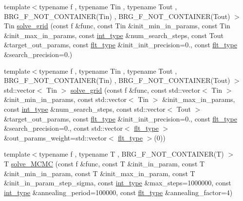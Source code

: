 \begin{DoxyCompactItemize}
\item 
{\footnotesize template$<$typename f , typename Tin , typename Tout , B\+R\+G\+\_\+\+F\+\_\+\+N\+O\+T\+\_\+\+C\+O\+N\+T\+A\+I\+N\+E\+R(\+Tin) , B\+R\+G\+\_\+\+F\+\_\+\+N\+O\+T\+\_\+\+C\+O\+N\+T\+A\+I\+N\+E\+R(\+Tout) $>$ }\\Tin \hyperlink{namespaceIceBRG_aa1178c976ba772b025aacf4b686cf17f}{solve\+\_\+grid} (const f \&func, const Tin \&init\+\_\+min\+\_\+in\+\_\+params, const Tin \&init\+\_\+max\+\_\+in\+\_\+params, const \hyperlink{lib_2IceBRG__main_2common_8h_ac4de9d9335536ac22821171deec8d39e}{int\+\_\+type} \&num\+\_\+search\+\_\+steps, const Tout \&target\+\_\+out\+\_\+params, const \hyperlink{lib_2IceBRG__main_2common_8h_ad0f130a56eeb944d9ef2692ee881ecc4}{flt\+\_\+type} \&init\+\_\+init\+\_\+precision=0., const \hyperlink{lib_2IceBRG__main_2common_8h_ad0f130a56eeb944d9ef2692ee881ecc4}{flt\+\_\+type} \&search\+\_\+precision=0.)
\item 
{\footnotesize template$<$typename f , typename Tin , typename Tout , B\+R\+G\+\_\+\+F\+\_\+\+N\+O\+T\+\_\+\+C\+O\+N\+T\+A\+I\+N\+E\+R(\+Tin) , B\+R\+G\+\_\+\+F\+\_\+\+N\+O\+T\+\_\+\+C\+O\+N\+T\+A\+I\+N\+E\+R(\+Tout) $>$ }\\std\+::vector$<$ Tin $>$ \hyperlink{namespaceIceBRG_a796f8239c7c8e5771b901fe380d24b96}{solve\+\_\+grid} (const f \&func, const std\+::vector$<$ Tin $>$ \&init\+\_\+min\+\_\+in\+\_\+params, const std\+::vector$<$ Tin $>$ \&init\+\_\+max\+\_\+in\+\_\+params, const \hyperlink{lib_2IceBRG__main_2common_8h_ac4de9d9335536ac22821171deec8d39e}{int\+\_\+type} \&num\+\_\+search\+\_\+steps, const std\+::vector$<$ Tout $>$ \&target\+\_\+out\+\_\+params, const \hyperlink{lib_2IceBRG__main_2common_8h_ad0f130a56eeb944d9ef2692ee881ecc4}{flt\+\_\+type} \&init\+\_\+init\+\_\+precision=0., const \hyperlink{lib_2IceBRG__main_2common_8h_ad0f130a56eeb944d9ef2692ee881ecc4}{flt\+\_\+type} \&search\+\_\+precision=0., const std\+::vector$<$ \hyperlink{lib_2IceBRG__main_2common_8h_ad0f130a56eeb944d9ef2692ee881ecc4}{flt\+\_\+type} $>$ \&out\+\_\+params\+\_\+weight=std\+::vector$<$ \hyperlink{lib_2IceBRG__main_2common_8h_ad0f130a56eeb944d9ef2692ee881ecc4}{flt\+\_\+type} $>$(0))
\item 
{\footnotesize template$<$typename f , typename T , B\+R\+G\+\_\+\+F\+\_\+\+N\+O\+T\+\_\+\+C\+O\+N\+T\+A\+I\+N\+E\+R(\+T) $>$ }\\T \hyperlink{namespaceIceBRG_aa51e1e175ccdd0ca0c583481f27cd903}{solve\+\_\+\+M\+C\+M\+C} (const f \&func, const T \&init\+\_\+in\+\_\+param, const T \&init\+\_\+min\+\_\+in\+\_\+param, const T \&init\+\_\+max\+\_\+in\+\_\+param, const T \&init\+\_\+in\+\_\+param\+\_\+step\+\_\+sigma, const \hyperlink{lib_2IceBRG__main_2common_8h_ac4de9d9335536ac22821171deec8d39e}{int\+\_\+type} \&max\+\_\+steps=1000000, const \hyperlink{lib_2IceBRG__main_2common_8h_ac4de9d9335536ac22821171deec8d39e}{int\+\_\+type} \&annealing\+\_\+period=100000, const \hyperlink{lib_2IceBRG__main_2common_8h_ad0f130a56eeb944d9ef2692ee881ecc4}{flt\+\_\+type} \&annealing\+\_\+factor=4)

\end{DoxyCompactItemize}
